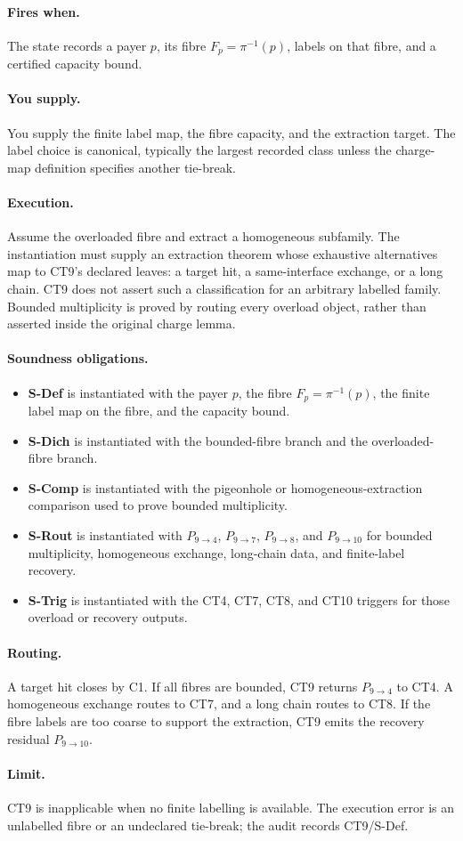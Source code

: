 \documentclass[
  11pt,
]{article}
\providecommand{\tightlist}{%
  \setlength{\itemsep}{0pt}\setlength{\parskip}{0pt}}
\theoremstyle{definition}
\newcommand{\ctpar}[1]{\paragraph{#1.}}
\begin{document}
\ctpar{Fires when}
The state records a payer \(p\), its fibre \(F_p=\pi^{-1}(p)\), labels
on that fibre, and a certified capacity bound.

\ctpar{You supply}
You supply the finite label map, the fibre capacity, and the extraction
target.  The label choice is canonical, typically the largest recorded
class unless the charge-map definition specifies another tie-break.

\ctpar{Execution}
Assume the overloaded fibre and extract a homogeneous subfamily. The
instantiation must supply an extraction theorem whose exhaustive
alternatives map to CT9's declared leaves: a target hit, a same-interface
exchange, or a long chain. CT9 does not assert such a classification for
an arbitrary labelled family. Bounded multiplicity is proved by routing
every overload object, rather than asserted inside the original charge
lemma.

\ctpar{Soundness obligations}
\begin{itemize}
\tightlist
\item \textbf{S-Def} is instantiated with the payer \(p\), the fibre \(F_p=\pi^{-1}(p)\), the finite label map on the fibre, and the capacity bound.
\item \textbf{S-Dich} is instantiated with the bounded-fibre branch and the overloaded-fibre branch.
\item \textbf{S-Comp} is instantiated with the pigeonhole or homogeneous-extraction comparison used to prove bounded multiplicity.
\item \textbf{S-Rout} is instantiated with \(P_{9\to4}\), \(P_{9\to7}\), \(P_{9\to8}\), and \(P_{9\to10}\) for bounded multiplicity, homogeneous exchange, long-chain data, and finite-label recovery.
\item \textbf{S-Trig} is instantiated with the CT4, CT7, CT8, and CT10 triggers for those overload or recovery outputs.
\end{itemize}

\ctpar{Routing}
A target hit closes by C1.  If all fibres are bounded, CT9 returns
\(P_{9\to4}\) to CT4.  A homogeneous exchange routes to CT7, and a long
chain routes to CT8.  If the fibre labels are too coarse to support the
extraction, CT9 emits the recovery residual \(P_{9\to10}\).

\ctpar{Limit}
CT9 is inapplicable when no finite labelling is available. The execution error
is an unlabelled fibre or an undeclared tie-break; the audit records
CT9/S-Def.
\end{document}
